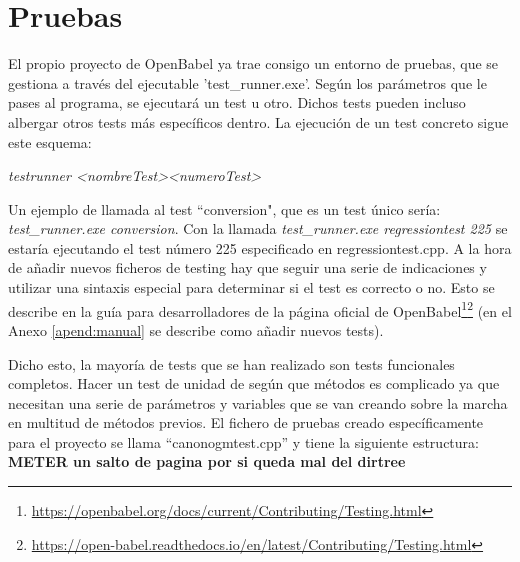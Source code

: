 \section{Pruebas}
El propio proyecto de OpenBabel ya trae consigo un entorno de pruebas, que se gestiona a través del ejecutable 'test\_runner.exe'. Según los parámetros que le pases al programa, se ejecutará un test u otro. Dichos tests pueden incluso albergar otros tests más específicos dentro. La ejecución de un test concreto sigue este esquema: 
\begin{center}
    \textit{test\textunderscore runner \textless nombreTest\textgreater  \textless numeroTest\textgreater}    
\end{center}

Un ejemplo de llamada al test ``conversion", que es un test único sería: \textit{test\_runner.exe conversion}. Con la llamada \textit{test\_runner.exe regressiontest 225} se estaría ejecutando el test número 225 especificado en regressiontest.cpp. A la hora de añadir nuevos ficheros de testing hay que seguir una serie de indicaciones y utilizar una sintaxis especial para determinar si el test es correcto o no. Esto se describe en la guía para desarrolladores de la página oficial de OpenBabel\footnote{\url{https://openbabel.org/docs/current/Contributing/Testing.html}}\footnotecomma\footnote{\url{https://open-babel.readthedocs.io/en/latest/Contributing/Testing.html}} (en el Anexo \ref{apend:manual} se describe como añadir nuevos tests).

Dicho esto, la mayoría de tests que se han realizado son tests funcionales completos. Hacer un test de unidad de según que métodos es complicado ya que necesitan una serie de parámetros y variables que se van creando sobre la marcha en multitud de métodos previos. El fichero de pruebas creado específicamente para el proyecto se llama ``canonogmtest.cpp'' y tiene la siguiente estructura:
\textbf{METER un salto de pagina por si queda mal del dirtree}
\vspace{0.2cm}

